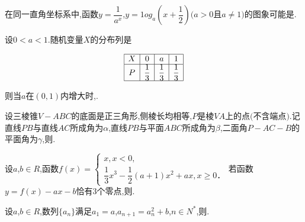 \question[4] 在同一直角坐标系中,函数$y= \dfrac {1}{a^{x}}$,$y=1og _{a} (x+ \dfrac {1}{2} )(a  \gt  0$且$a\neq 1)$的图象可能是.
\begin{center}
\vspace{0.5cm}
\end{center}
\begin{solution}{4cm}

\end{solution}



\question[4] 设$0  \lt  a  \lt  1.$随机变量$X$的分布列是

\[\begin{array}{|c|c|c|c|}
\hline
X & 0 & a & 1\\
\hline
P & \dfrac {1}{3} & \dfrac {1}{3} & \dfrac {1}{3}\\
\hline
\end{array}\]


则当$a$在$(0 , 1)$内增大时,.
\begin{solution}{4cm}

\end{solution}



\question[4] 设三棱锥$V-ABC$的底面是正三角形,侧棱长均相等,$P$是棱$VA$上的点$($不含端点$).$记直线$PB$与直线$AC$所成角为$ \alpha $,直线$PB$与平面$ABC$所成角为$ \beta $,二面角$P-AC-B$的平面角为$γ$,则.
\begin{solution}{4cm}

\end{solution}



\question[4] 设$a$,$b \in R$,函数$f(x)= \begin{cases} x,x  \lt  0, \\ \dfrac {1}{3}x^{3}- \dfrac {1}{2}(a+1)x^{2}+ax,x\geqslant 0．\end{cases}$若函数$y=f(x)-ax-b$恰有$3$个零点,则.
\begin{solution}{4cm}

\end{solution}



\question[4] 设$a$,$b \in R$,数列$\{a _{n} \}$满足$a _{1} =a$,$a _{n+1} =a _{n} ^{2} +b$,$n \in N ^{*}$,则.
\begin{solution}{4cm}

\end{solution}
